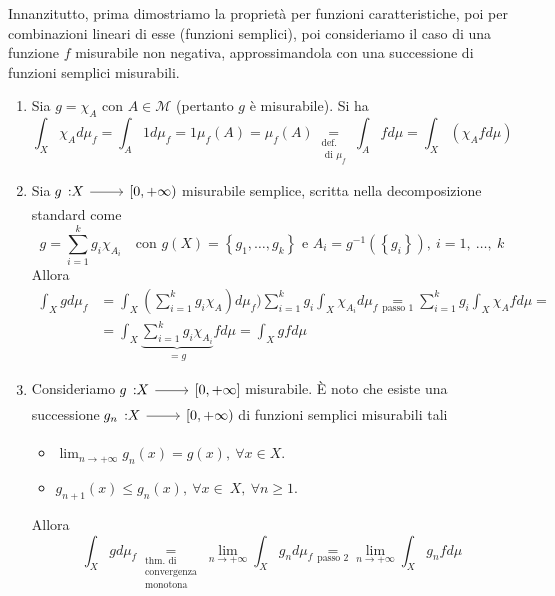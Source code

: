\begin{demonstration}
	Innanzitutto, prima dimostriamo la proprietà per funzioni caratteristiche, poi per combinazioni lineari di esse (funzioni semplici), poi consideriamo il caso di una funzione $f$ misurabile non negativa, approssimandola con una successione di funzioni semplici misurabili.\\
	\begin{enumerate}[label=\Roman*]
		\item Sia $g=\chi_A$ con $A\in\mathcal{M}$ (pertanto $g$ è misurabile). Si ha
		\begin{equation*}
			\int_X\chi_Ad\mu_f=\int_A 1d\mu_f=1\mu_f\left(A\right)=\mu_f\left(A\right)\underset{\substack{\text{def.}\\\text{ di }\mu_f}}{=}\int_Afd\mu=\int_X\left(\chi_Afd\mu\right)
		\end{equation*}
		\item Sia $\funz{g}{X}{\left[0,+\infty\right)}$ misurabile semplice, scritta nella decomposizione standard come
		\begin{equation*}
			g=\sum_{i=1}^kg_i\chi_{A_i}\quad\text{con }g(X)=\left\{g_1,\ldots,g_k\right\}\text{ e }A_i=g^{-1}\left(\left\{g_i\right\}\right),\ i=1,\ \ldots,\ k
		\end{equation*}
	Allora
	\begin{align*}
			\int_Xgd\mu_f&=\int_X\left(\sum_{i=1}^kg_i\chi_A\right)d\mu_f)\sum_{i=1}^{k}g_i\int_X\chi_{A_i}d\mu_f\underset{\text{passo }1}{=}\sum_{i=1}^{k}g_i\int_X\chi_Afd\mu=\\
			&=\int_X\underbrace{\sum_{i=1}^{k}g_i\chi_{A_i}}_{=g}fd\mu=\int_Xgfd\mu
	\end{align*}
	\item Consideriamo $\funz{g}{X}{\left[0,+\infty\right]}$ misurabile. È noto che esiste una successione $\funz{g_n}{X}{\left[0,+\infty\right)}$ di funzioni semplici misurabili tali
	\begin{itemize}
		\item $\displaystyle\lim_{n\to+\infty}g_n(x)=g(x),\ \forall x\in X$.
		\item $g_{n+1}(x)\leq g_n(x),\ \forall x\in\ X,\ \forall n\geq 1$.
	\end{itemize}
Allora
	\begin{equation*}
	\int_Xgd\mu_f\underset{\substack{\text{thm. di}\\\text{convergenza}\\\text{monotona}}}{=}\lim_{n\to+\infty}\int_Xg_nd\mu_f\underset{\text{passo }2}{=}\lim_{n\to+\infty}\int_Xg_nfd\mu

\end{equation*}
\end{enumerate}
\end{demonstration}
